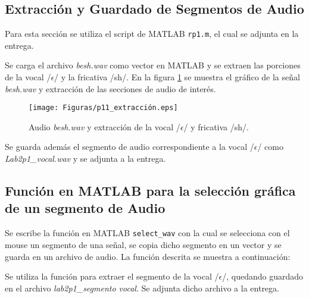 \subsection{Extracción y Guardado de Segmentos de Audio}

Para esta sección se utiliza el script de MATLAB \texttt{rp1.m}, el cual se adjunta en la entrega.

Se carga el archivo \textit{besh.wav} como vector en MATLAB y se extraen las porciones de la vocal /$\epsilon$/ y la fricativa /sh/. En la figura \ref{fig:p11_extraccion} se muestra el gráfico de la señal \textit{besh.wav} y extracción de las secciones de audio de interés.

\begin{figure}[H]
    \centering
    \texttt{[image: Figuras/p11\_extracción.eps]}
    \caption{Audio \textit{besh.wav} y extracción de la vocal /$\epsilon$/ y fricativa /sh/.}
    \label{fig:p11_extraccion}
\end{figure}

Se guarda además el segmento de audio correspondiente a la vocal /$\epsilon$/ como \textit{Lab2p1\_vocal.wav} y se adjunta a la entrega.

\subsection{Función en MATLAB para la selección gráfica de un segmento de Audio}

Se escribe la función en MATLAB \texttt{select\_wav} con la cual se selecciona con el mouse un segmento de una señal, se copia dicho segmento en un vector y se guarda en un archivo de audio. La función descrita se muestra a continuación:



Se utiliza la función para extraer el segmento de la vocal /$\epsilon$/, quedando guardado en el archivo \textit{lab2p1\_segmento vocal}. Se adjunta dicho archivo a la entrega.